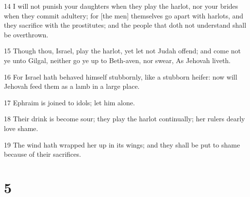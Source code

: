 \par 14 I will not punish your daughters when they play the harlot, nor your brides when they commit adultery; for [the men] themselves go apart with harlots, and they sacrifice with the prostitutes; and the people that doth not understand shall be overthrown.
\par 15 Though thou, Israel, play the harlot, yet let not Judah offend; and come not ye unto Gilgal, neither go ye up to Beth-aven, nor swear, As Jehovah liveth.
\par 16 For Israel hath behaved himself stubbornly, like a stubborn heifer: now will Jehovah feed them as a lamb in a large place.
\par 17 Ephraim is joined to idols; let him alone.
\par 18 Their drink is become sour; they play the harlot continually; her rulers dearly love shame.
\par 19 The wind hath wrapped her up in its wings; and they shall be put to shame because of their sacrifices.

\chapter{5}

